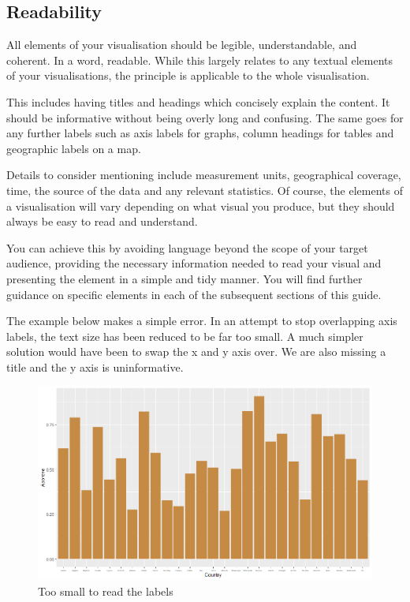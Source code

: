 \documentclass[
]{book}
\begin{document}
\hypertarget{readability}{%
\subsection{Readability}\label{readability}}

All elements of your visualisation should be legible, understandable, and coherent. In a word, readable. While this largely relates to any textual elements of your visualisations, the principle is applicable to the whole visualisation.

This includes having titles and headings which concisely explain the content. It should be informative without being overly long and confusing. The same goes for any further labels such as axis labels for graphs, column headings for tables and geographic labels on a map.

Details to consider mentioning include measurement units, geographical coverage, time, the source of the data and any relevant statistics.
Of course, the elements of a visualisation will vary depending on what visual you produce, but they should always be easy to read and understand.

You can achieve this by avoiding language beyond the scope of your target audience, providing the necessary information needed to read your visual and presenting the element in a simple and tidy manner. You will find further guidance on specific elements in each of the subsequent sections of this guide.

The example below makes a simple error. In an attempt to stop overlapping axis labels, the text size has been reduced to be far too small. A much simpler solution would have been to swap the x and y axis over. We are also missing a title and the y axis is uninformative.

\begin{figure}
\centering
\includegraphics{img/bar chart poor.png}
\caption{Too small to read the labels}
\end{figure}
\end{document}
